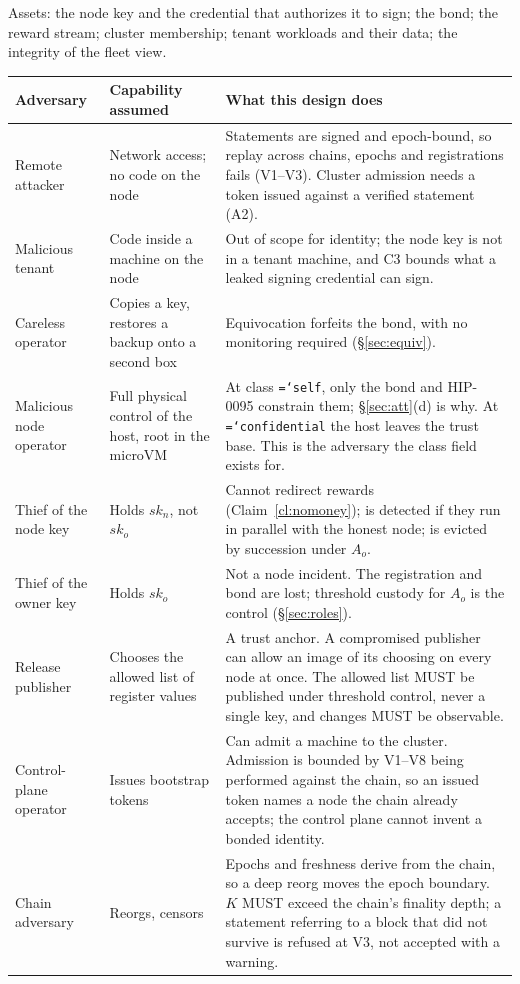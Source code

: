 \documentclass[11pt,a4paper]{article}
\newcommand{\code}[1]{\texttt{\hyphenchar\font=`\-\relax #1}}
\begin{document}
Assets: the node key and the credential that authorizes it to sign; the bond; the
reward stream; cluster membership; tenant workloads and their data; the integrity
of the fleet view.

\begin{center}
\small
\begin{tabular}{@{}>{\raggedright\arraybackslash}p{}>{\raggedright\arraybackslash}p{}>{\raggedright\arraybackslash}p{}@{}}
\toprule
\textbf{Adversary} & \textbf{Capability assumed} & \textbf{What this design does} \\
\midrule
Remote attacker &
Network access; no code on the node &
Statements are signed and epoch-bound, so replay across chains, epochs and
registrations fails (V1--V3). Cluster admission needs a token issued against a
verified statement (A2). \\[3pt]
Malicious tenant &
Code inside a machine on the node &
Out of scope for identity; the node key is not in a tenant machine, and C3 bounds
what a leaked signing credential can sign. \\[3pt]
Careless operator &
Copies a key, restores a backup onto a second box &
Equivocation forfeits the bond, with no monitoring required (\S\ref{sec:equiv}). \\[3pt]
Malicious node operator &
Full physical control of the host, root in the microVM &
At class \code{self}, only the bond and HIP-0095 constrain them; \S\ref{sec:att}(d)
is why. At \code{confidential} the host leaves the trust base. This is the
adversary the class field exists for. \\[3pt]
Thief of the node key &
Holds $sk_n$, not $sk_o$ &
Cannot redirect rewards (Claim~\ref{cl:nomoney}); is detected if they run in
parallel with the honest node; is evicted by succession under $A_o$. \\[3pt]
Thief of the owner key &
Holds $sk_o$ &
Not a node incident. The registration and bond are lost; threshold custody for
$A_o$ is the control (\S\ref{sec:roles}). \\[3pt]
Release publisher &
Chooses the allowed list of register values &
A trust anchor. A compromised publisher can allow an image of its choosing on
every node at once. The allowed list MUST be published under threshold control,
never a single key, and changes MUST be observable. \\[3pt]
Control-plane operator &
Issues bootstrap tokens &
Can admit a machine to the cluster. Admission is bounded by V1--V8 being performed
against the chain, so an issued token names a node the chain already accepts; the
control plane cannot invent a bonded identity. \\[3pt]
Chain adversary &
Reorgs, censors &
Epochs and freshness derive from the chain, so a deep reorg moves the epoch
boundary. $K$ MUST exceed the chain's finality depth; a statement referring to a
block that did not survive is refused at V3, not accepted with a warning. \\
\bottomrule
\end{tabular}
\end{center}
\end{document}
